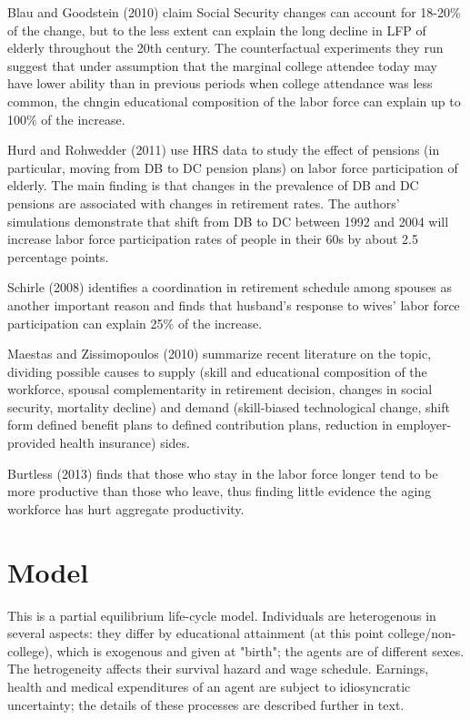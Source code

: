 \documentclass[
10pt, %
a4paper, %
oneside, %
headinclude,footinclude, %
BCOR5mm, %
]{scrartcl}
\begin{document}
Blau and Goodstein (2010\cite{Blau2010}) claim Social Security changes can account for 18-20\% of the change, but to the less extent  can explain the long decline in LFP of elderly throughout the 20th century. The counterfactual experiments they run suggest that under assumption that the marginal college attendee today may have lower ability than in previous periods when college attendance was less common, the chngin educational composition of the labor force can explain up to 100\% of the increase. 

Hurd and Rohwedder (2011\cite{Hurd2011}) use HRS data to study the effect of pensions (in particular, moving from DB to DC pension plans) on labor force participation of elderly. The main finding is that changes in the prevalence of DB and DC pensions are associated with changes in retirement rates. The authors' simulations demonstrate that shift from DB to DC between 1992 and 2004 will increase labor force participation rates of people in their 60s by about 2.5 percentage points.

Schirle (2008\cite{Schirle2008}) identifies a coordination in retirement schedule among spouses as another important reason and finds that husband's response to wives' labor force participation can explain 25\% of the increase.

Maestas and Zissimopoulos (2010\cite{Maestas2010}) summarize recent literature on the topic, dividing possible causes to supply (skill and educational composition of the workforce, spousal complementarity in retirement decision, changes in social security, mortality decline) and demand (skill-biased technological change, shift form defined benefit plans to defined contribution plans, reduction in employer-provided health insurance) sides.

Burtless (2013\cite{Burtless2013}) finds that those who stay in the labor force longer tend to be more productive than those who leave, thus finding little evidence the aging workforce has hurt aggregate productivity.

\section{Model}
This is a partial equilibrium life-cycle model. Individuals are heterogenous in several aspects: they differ by educational attainment (at this point college/non-college), which is exogenous and given at "birth"; the agents are of different sexes. The hetrogeneity affects their survival hazard and wage schedule. Earnings, health and medical expenditures of an agent are subject to idiosyncratic uncertainty; the details of these processes are described further in text.
\end{document}
